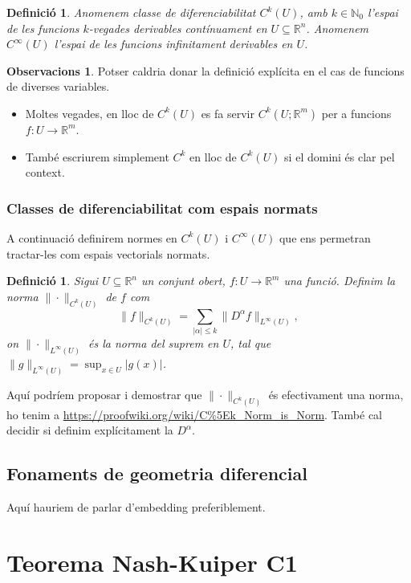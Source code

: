 \documentclass[11pt,a4paper,openright,oneside]{book}
\numberwithin{equation}{section}
\newtheorem{defi}[teo]{Definici\'o}
\theoremstyle{definition}
\newtheorem{obss}[teo]{Observacions}
\begin{document}
\begin{defi}
    Anomenem \textit{classe de diferenciabilitat} $C^k(U)$, amb $k\in\mathbb N_0$ l'espai de les funcions $k$-vegades derivables contínuament en $U\subseteq\mathbb R^n$. Anomenem $C^\infty(U)$ l'espai de les funcions infinitament derivables en $U$.
\end{defi}
\begin{obss}{\color{blue} Potser caldria donar la definició explícita en el cas de funcions de diverses variables.}
\end{obss}
\begin{itemize}
    \item Moltes vegades, en lloc de $C^k(U)$ es fa servir $C^k(U;\mathbb R^m)$ per a funcions $f:U\to\mathbb R^m$.
    \item També escriurem simplement $C^k$ en lloc de $C^k(U)$ si el domini és clar pel context.
\end{itemize}

\subsection{Classes de diferenciabilitat com espais normats}
A continuació definirem normes en $C^k(U)$ i $C^\infty(U)$ que ens permetran tractar-les com espais vectorials normats.
\begin{defi}
    Sigui $U\subseteq\mathbb R^n$ un conjunt obert, $f:U\to\mathbb R^m$ una funció. Definim la norma $\|\cdot\|_{C^k(U)}$ de $f$ com
    \begin{equation*}
        \|f\|_{C^k(U)} = \sum_{|\alpha|\le k} \|D^\alpha f\|_{L^\infty(U)},
    \end{equation*}
    on $\|\cdot\|_{L^\infty(U)}$ és la norma del suprem en $U$, tal que $\|g\|_{L^\infty(U)} = \sup_{x\in U} |g(x)|$.
\end{defi}
{\color{blue} Aquí podríem proposar i demostrar que $\|\cdot\|_{C^k(U)}$ és efectivament una norma, ho tenim a \url{https://proofwiki.org/wiki/C%5Ek_Norm_is_Norm}. També cal decidir si definim explícitament la $D^\alpha$.}

\section{Fonaments de geometria diferencial}
Aquí hauriem de parlar d'embedding preferiblement.






\newpage

\chapter{Teorema Nash-Kuiper C1}
\end{document}

